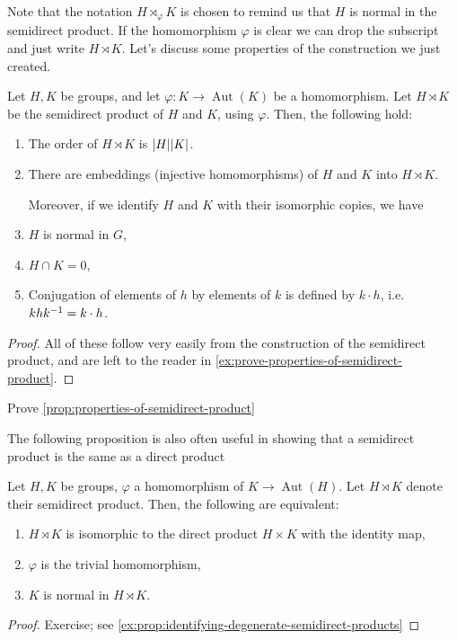 \documentclass[./main.tex]{subfiles}
\begin{document}
Note that the notation $H \rtimes_\varphi K$ is chosen to remind us that $H$ is
normal in the semidirect product. If the homomorphism $\varphi$ is clear we can
drop the subscript and just write $H \rtimes K$. Let's discuss some properties
of the construction we just created.

\begin{proposition}
\label{prop:properties-of-semidirect-product}
Let $H, K$ be groups, and let $\varphi: K \to \operatorname{Aut}(K)$ be a
homomorphism. Let $H \rtimes K$ be the semidirect product of $H$ and $K$, using
$\varphi$. Then, the following hold:

\begin{enumerate}[label=(\arabic*)]
    \item The order of $H \rtimes K$ is $\abs H \abs K$.
    \item There are embeddings (injective homomorphisms) of $H$ and $K$ into $H \rtimes K$.

Moreover, if we identify $H$ and $K$ with their isomorphic copies, we have
    \item $H$ is normal in $G$, 
    \item $H \cap K = 0$,
    \item Conjugation of elements of $h$ by elements of $k$ is defined by $k
    \cdot h$, i.e. $k h k^{-1} = k \cdot h$.
\end{enumerate}

\end{proposition}
\begin{proof}
    All of these follow very easily from the construction of the semidirect
    product, and are left to the reader in
    \cref{ex:prove-properties-of-semidirect-product}.
\end{proof}
\begin{exercise}
\label{ex:prove-properties-of-semidirect-product}
    Prove \cref{prop:properties-of-semidirect-product}
\end{exercise}


The following proposition is also often useful in showing that a semidirect
product is the same as a direct product
\begin{proposition}
\label{prop:identifying-degenerate-semidirect-products}
    Let $H, K$ be groups, $\varphi$ a homomorphism of $K \to
    \operatorname{Aut}(H)$. Let $H \rtimes K$ denote their semidirect product.
    Then, the following are equivalent:

    \begin{enumerate}
        \item $H \rtimes K$ is isomorphic to the direct product $H \times K$ with the identity map,
        \item $\varphi$ is the trivial homomorphism, 
        \item $K$ is normal in $H \rtimes K$.
    \end{enumerate}
\end{proposition}
\begin{proof}
    Exercise; see \cref{ex:prop:identifying-degenerate-semidirect-products}
\end{proof}
\end{document}
